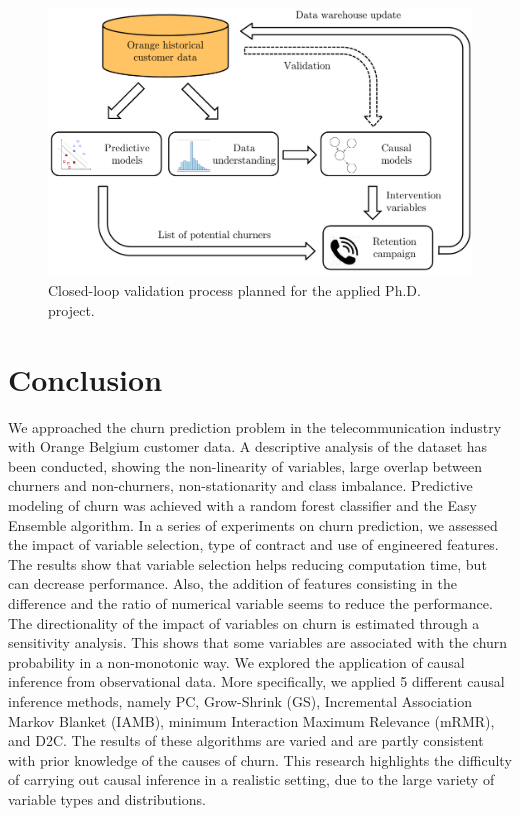 \begin{figure}
    \centering
	\includegraphics[width=0.95\linewidth]{figures/machu-picchu.pdf}
	\caption{Closed-loop validation process planned for the applied Ph.D.
	project.}
	\label{fig:machu-picchu}
\end{figure}

\section{Conclusion}

We approached the churn prediction problem in the telecommunication industry
with Orange Belgium customer data. A descriptive analysis of the dataset has
been conducted, showing the non-linearity of variables, large overlap between
churners and non-churners, non-stationarity and class imbalance. Predictive
modeling of churn was achieved with a random forest classifier and the Easy
Ensemble algorithm. In a series of experiments on churn prediction, we assessed
the impact of variable selection, type of contract and use of engineered
features. The results show that variable selection helps reducing computation
time, but can decrease performance. Also, the addition of features consisting in
the difference and the ratio of numerical variable seems to reduce the
performance. The directionality of the impact of variables on churn is estimated
through a sensitivity analysis. This shows that some variables are associated
with the churn probability in a non-monotonic way. We explored the application
of causal inference from observational data. More specifically, we applied 5
different causal inference methods, namely PC, Grow-Shrink (GS), Incremental
Association Markov Blanket (IAMB), minimum Interaction Maximum Relevance (mRMR),
and D2C. The results of these algorithms are varied and are partly consistent
with prior knowledge of the causes of churn. This research highlights the
difficulty of carrying out causal inference in a realistic setting, due to the
large variety of variable types and distributions.
